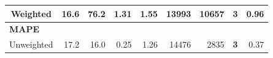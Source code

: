 {\begin{landscape}
\begin{table}[]
\begin{tabular}{crrrrrrrr}
Weighted                                                                                                   & 16.6                                                                                   & 76.2                                                                                        & 1.31                                                                            & 1.55                                                                                          & 13993                                                                                     & 10657                                                                                              & 3                                                                                       & 0.96                                                                                   \\ \hline
\multicolumn{9}{l}{\textbf{MAPE}}                                                                                                                                                                                                                                                                                                                                                                                                                                                                                                                                                                                                                                                                                                                                                                                                                                       \\
Unweighted                                                                                                 & 17.2                                                                                   & 16.0                                                                                        & 0.25                                                                            & 1.26                                                                                          & 14476                                                                                     & 2835                                                                                               & \textbf{3}                                                                              & 0.37                                                                                   \\

\end{tabular}
\end{table}
\end{landscape}}
